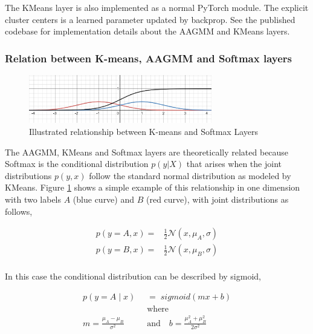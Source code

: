 \documentclass[10pt,twocolumn,letterpaper]{article}
\begin{document}
The KMeans layer is also implemented as a normal PyTorch \cite{pytorch} module.
The explicit cluster centers is a learned parameter updated by backprop.
See the published codebase for implementation details about the AAGMM and KMeans layers.

\subsubsection{Relation between K-means, AAGMM and Softmax layers}

\begin{figure}[h]
	\includegraphics[width=8cm]{figures/kmeans_softmax.png}
	\caption{Illustrated relationship between K-means and Softmax Layers}
	\label{gauss}
\end{figure}

The AAGMM, KMeans and Softmax layers are theoretically related because Softmax is the conditional distribution $p(y|X)$ that arises when the joint distributions $p(y,x)$ follow the standard normal distribution as modeled by KMeans.  Figure \ref{gauss} shows a simple example of this relationship in one dimension with two labels $A$ (blue curve) and $B$ (red curve), with joint distributions as follows,

\begin{equation}
	\begin{aligned}
		p(y=A,x) =& \frac{1}{2} \mathcal{N}(x,\mu_A,\sigma) \\
		p(y=B,x) =& \frac{1}{2} \mathcal{N}(x,\mu_B,\sigma) \\
	\end{aligned}
\end{equation}

In this case the conditional distribution can be described by sigmoid,

\begin{equation}
	\begin{aligned}
		p(y=A\; |\;x) \;\; &= \; \textit{sigmoid}(mx + b) \\[6pt]
		&\text{where} \\
		m = \frac{\mu_A - \mu_B}{\sigma^2} \quad &\text{and}  \quad
		b = \frac{\mu_A^2 + \mu_B^2}{2 \sigma^2}
	\end{aligned}
\end{equation}
\end{document}
